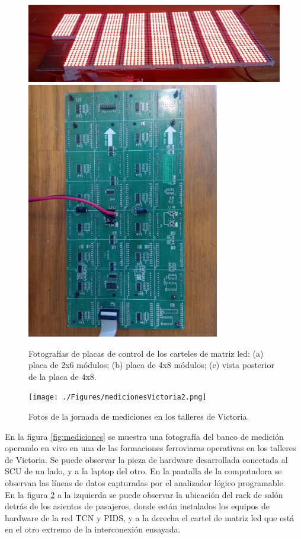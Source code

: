 \begin{figure}[H]
	\centering
	\includegraphics[width=1\textwidth]{./Figures/cartelledON.jpg}\\
	\includegraphics[width=0.75\textwidth, angle=270]{./Figures/cartel4x8.jpg}\\
	\caption{Fotografías de placas de control de los carteles de matriz led: (a) placa de 2x6 módulos; (b) placa de 4x8 módulos; (c) vista posterior de la placa de 4x8.}
	\label{fig:picsDriverled}
\end{figure}


\begin{figure}[H]
	\centering
	\texttt{[image: ./Figures/medicionesVictoria2.png]}
	\caption{Fotos de la jornada de mediciones en los talleres de Victoria.}
	\label{fig:medicionesVictoria2}
\end{figure}

En la figura \ref{fig:mediciones} se muestra una fotografía del banco de medición operando en vivo en una de las formaciones ferroviaras operativas en los talleres de Victoria. Se puede observar la pieza de hardware desarrollada conectada al SCU de un lado, y a la laptop del otro. En la pantalla de la computadora se observan las líneas de datos capturadas por el analizador lógico programable.\\
En la figura \ref{fig:medicionesVictoria2} a la izquierda se puede observar la ubicación del rack de salón detrás de los asientos de pasajeros, donde están instalados los equipos de hardware de la red TCN y PIDS, y a la derecha el cartel de matriz led que está en el otro extremo de la interconexión ensayada.\\

